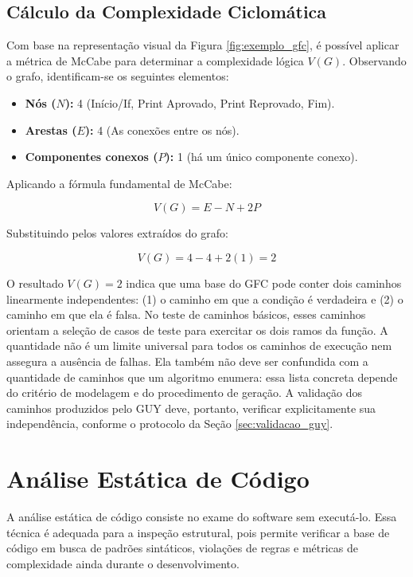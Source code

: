 \subsection{Cálculo da Complexidade Ciclomática}
Com base na representação visual da Figura \ref{fig:exemplo_gfc}, é possível aplicar a métrica de McCabe para determinar a complexidade lógica $V(G)$. Observando o grafo, identificam-se os seguintes elementos:

\begin{itemize}
    \item \textbf{Nós ($N$):} 4 (Início/If, Print Aprovado, Print Reprovado, Fim).
    \item \textbf{Arestas ($E$):} 4 (As conexões entre os nós).
    \item \textbf{Componentes conexos ($P$):} 1 (há um único componente conexo).
\end{itemize}

Aplicando a fórmula fundamental de McCabe:

\begin{equation}
    V(G) = E - N + 2P
\end{equation}

Substituindo pelos valores extraídos do grafo:

\[
    V(G) = 4 - 4 + 2(1) = 2
\]

O resultado $V(G) = 2$ indica que uma base do GFC pode conter dois caminhos linearmente independentes: (1) o caminho em que a condição é verdadeira e (2) o caminho em que ela é falsa. No teste de caminhos básicos, esses caminhos orientam a seleção de casos de teste para exercitar os dois ramos da função. A quantidade não é um limite universal para todos os caminhos de execução nem assegura a ausência de falhas. Ela também não deve ser confundida com a quantidade de caminhos que um algoritmo enumera: essa lista concreta depende do critério de modelagem e do procedimento de geração. A validação dos caminhos produzidos pelo GUY deve, portanto, verificar explicitamente sua independência, conforme o protocolo da Seção \ref{sec:validacao_guy}.



\section{Análise Estática de Código}

A análise estática de código consiste no exame do software sem executá-lo. Essa técnica é adequada para a inspeção estrutural, pois permite verificar a base de código em busca de padrões sintáticos, violações de regras e métricas de complexidade ainda durante o desenvolvimento.


